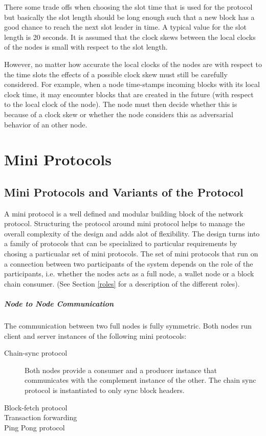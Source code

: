 \documentclass{report}
\newcommand{\wip}[1]{\color{magenta}{#1}\color{black}}
\theoremstyle{definition}{
  \newtheorem{lemma}{Lemma}[section] %
  \newtheorem{definition}[lemma]{Definition}
}
\theoremstyle{theorem}{
  \newtheorem{invariant}[lemma]{Invariant}
  \newtheorem{proofobligation}[lemma]{Proof Obligation}
}
\numberwithin{equation}{lemma}
\begin{document}
There some trade offs when choosing the slot time that is used for the protocol but
basically the slot length should be long enough such that a new block has a good chance to reach the
next slot leader in time.
A typical value for the slot length is 20 seconds.
It is assumed that the clock skews between the local clocks of the nodes is small with respect to the
slot length.

However, no matter how accurate the local clocks of the nodes are with respect to the time slots
the effects of a possible clock skew must still be carefully considered.
For example, when a node time-stamps incoming blocks with its local clock time, it may encounter
blocks that are created in the future
(with respect to the local clock of the node).
The node must then decide whether this is because of a clock skew or whether the node considers this
as adversarial behavior of an other node.

\wip{TODO :: get feedback from the researchers on this. Tentative policy: allow 200ms to 1s
explain the problem in detail.
a node cannot forward a block from the future.
This is complicated !
}

\chapter{Mini Protocols}
\label{state-machine-section}

\section{Mini Protocols and Variants of the Protocol}
A mini protocol is a well defined and modular building block of
the network protocol.
Structuring the protocol around mini protocol helps to manage the overall complexity of
the design and adds alot of flexibility.
The design turns into a family of protocols that can be specialized to particular requirements
by chosing a particualar set of mini protocols.
The set of mini protocols that run on a connection between two participants of the system depends on
the role of the participants, i.e. whether the nodes acts as a full node, a wallet node or a
block chain consumer.
(See Section \ref{roles} for a description of the different roles).
\paragraph{Node to Node Communication}
The communication between two full nodes is fully symmetric.
Both nodes run client and server instances of the following mini protocols:
\begin{description}
\item[Chain-sync protocol] Both nodes provide a consumer and a producer instance that communicates with
  the complement instance of the other. The chain sync protocol is instantiated to only sync block headers.
\item[Block-fetch protocol]
\item[Transaction forwarding]
\item[Ping Pong protocol]
\end{description}
\end{document}
